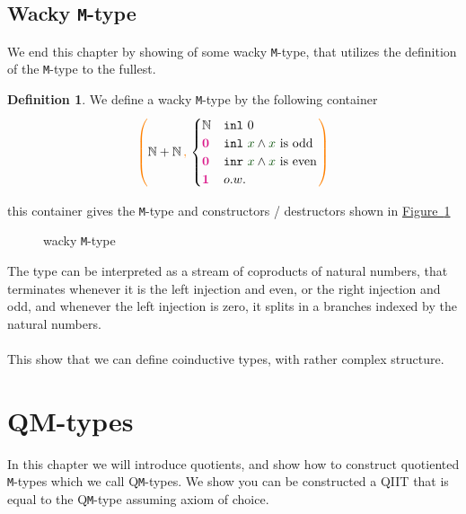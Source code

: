 \documentclass[twoside,11pt,openright]{report}
\theoremstyle{plain} %
\theoremstyle{definition}
\newtheorem{defn}[thm]{Definition}%
\theoremstyle{remark}
\newcommand*{\figref}[1]{\hyperref[fig:#1]{Figure~\ref*{fig:#1}}}
\newcommand*{\term}[1]{\textcolor{green!30!black}{#1}} %
\newcommand*{\type}[1]{\textcolor{magenta!90!black}{#1}}
\newcommand*{\containerpair}[2]{\ensuremath{\colorlet{savedleftcolor}{.}\color{orange}\left(\color{savedleftcolor}#1\,\textcolor{orange}{\mathbf{,}}\,#2\color{orange}\right)\color{savedleftcolor}}}
\newcommand*{\unit}{\type{\textbf{1}}}
\newcommand*{\empt}{\type{\textbf{0}}}
\newcommand*{\constructor}[1]{\textcolor{purple!60!black}{\ensuremath{\mathtt{#1}}}}
\newcommand*{\destructor}[1]{\textcolor{yellow!60!black}{\ensuremath{\mathtt{#1}}}}
\begin{document}
\section{Wacky \texttt{M}-type}
We end this chapter by showing of some wacky \texttt{M}-type, that utilizes the definition of the \texttt{M}-type to the fullest.
\begin{defn}
  We define a wacky \texttt{M}-type by the following container
  \begin{equation}
    \containerpair{\mathbb{N} + \mathbb{N}}{\begin{cases} \mathbb{N} & \mathtt{inl}~0 \\ \empt & \mathtt{inl}~\term{x} \land \term{x}~\text{is odd} \\ \empt & \mathtt{inr}~\term{x} \land \term{x}~\text{is even} \\ \unit & o.w. \end{cases}}
  \end{equation}
\end{defn}
this container gives the \texttt{M}-type and constructors / destructors shown in \figref{wacky-m-type}
\begin{figure}[h]
  \centering
  \caption{wacky \texttt{M}-type}
  \label{fig:wacky-m-type}
\end{figure}
The type can be interpreted as a stream of coproducts of natural numbers, that terminates whenever it is the left injection and even, or the right injection and odd, and whenever the left injection is zero, it splits in a branches indexed by the natural numbers.
\\ \\
This show that we can define coinductive types, with rather complex structure.



\chapter{QM-types}
In this chapter we will introduce quotients, and show how to construct quotiented \texttt{M}-types which we call Q\texttt{M}-types. We show you can be constructed a QIIT that is equal to the Q\texttt{M}-type assuming axiom of choice. 
\end{document}
